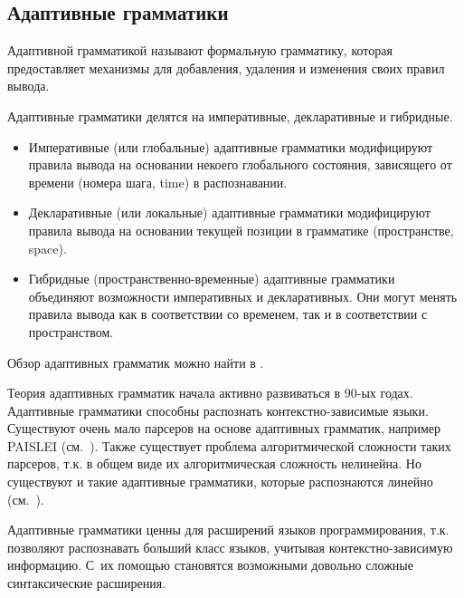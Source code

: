 \documentclass[a4paper,12pt,titlepage]{extarticle}
\begin{document}
\subsection{Адаптивные грамматики}
\label{adaptive}
Адаптивной грамматикой называют формальную грамматику, которая предоставляет
механизмы для добавления, удаления и изменения своих правил вывода.

Адаптивные грамматики делятся на императивные, декларативные и гибридные.
\begin{itemize}
  \item Императивные (или глобальные) адаптивные грамматики модифицируют правила
  вывода на основании некоего глобального состояния, зависящего от времени
  (номера шага, time) в распознавании.
  \item Декларативные (или локальные) адаптивные грамматики модифицируют правила
  вывода на основании текущей позиции в грамматике (пространстве, space).
  \item Гибридные (пространственно-временные) адаптивные грамматики объединяют
  возможности императивных и декларативных. Они могут менять правила вывода как
  в соответствии со временем, так и в соответствии с пространством.
\end{itemize}
Обзор адаптивных грамматик можно найти в \cite{adaptive}.

Теория адаптивных грамматик начала активно развиваться в 90-ых годах.
Адаптивные грамматики способны распознать контекстно-зависимые языки.
Существуют очень мало парсеров на основе адаптивных грамматик, например PAISLEI
(см.~\cite{paislei}). Также существует проблема алгоритмической сложности таких
парсеров, т.к. в общем виде их алгоритмическая сложность нелинейна. Но
существуют и такие адаптивные грамматики, которые распознаются линейно
(см.~\cite{paislei}).

Адаптивные грамматики ценны для расширений языков программирования, т.к.
позволяют распознавать больший класс языков, учитывая контекстно-зависимую
информацию. С~их помощью становятся возможными довольно сложные синтаксические
расширения.
\end{document}
